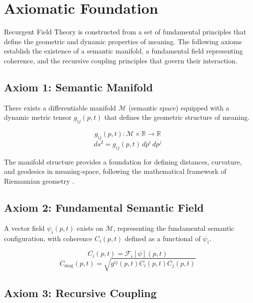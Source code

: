 \chapter{Axiomatic Foundation}

Recurgent Field Theory is constructed from a set of fundamental principles that define the geometric and dynamic properties of meaning. The following axioms establish the existence of a semantic manifold, a fundamental field representing coherence, and the recursive coupling principles that govern their interaction.

\section{Axiom 1: Semantic Manifold}

There exists a differentiable manifold \(\mathcal{M}\) (semantic space) equipped with a dynamic metric tensor \(g_{ij}(p,t)\) that defines the geometric structure of meaning.

\begin{equation}
g_{ij}(p,t) : \mathcal{M} \times \mathbb{R} \rightarrow \mathbb{R}
\end{equation}
\begin{equation}
ds^2 = g_{ij}(p,t) \, dp^i \, dp^j
\end{equation}

The manifold structure provides a foundation for defining distances, curvature, and geodesics in meaning-space, following the mathematical framework of Riemannian geometry \autocite{Riemann1868}.

\section{Axiom 2: Fundamental Semantic Field}

A vector field \(\psi_i(p,t)\) exists on \(\mathcal{M}\), representing the fundamental semantic configuration, with coherence \(C_i(p,t)\) defined as a functional of \(\psi_i\).

\begin{equation}
C_i(p,t) = \mathcal{F}_i[\psi](p,t)
\end{equation}
\begin{equation}
C_{\text{mag}}(p,t) = \sqrt{g^{ij}(p,t) C_i(p,t) C_j(p,t)}
\end{equation}

\section{Axiom 3: Recursive Coupling}

